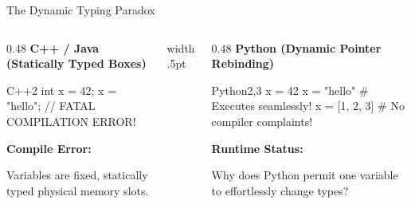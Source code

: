 \begin{frame}[fragile]{The Dynamic Typing Paradox}
  \begin{columns}[T,onlytextwidth]
    \begin{column}{0.48\textwidth}
      {\small\bfseries\color{UpGradRed}C++ / Java (Statically Typed Boxes)}\par\vspace{0.08cm}
      \begin{HighlightedCodeBlock}{C++}{2}
int x = 42;
x = "hello"; // FATAL COMPILATION ERROR!
      \end{HighlightedCodeBlock}
      \vspace{0.08cm}
      \begin{tcolorbox}[enhanced,arc=1mm,boxrule=.4pt,colback=UpGradRed!10,colframe=UpGradRed,left=2mm,right=2mm,top=1.5mm,bottom=1.5mm]
        {\scriptsize\bfseries\color{UpGradRedDark}Compile Error:}
      \end{tcolorbox}
      \vspace{0.04cm}
      {\scriptsize\color{UpGradSlate}Variables are fixed, statically typed physical memory slots.}
    \end{column}
    \hfill{\color{UpGradRule}\vrule width .5pt}\hfill
    \begin{column}{0.48\textwidth}
      {\small\bfseries\color{AWSBlue}Python (Dynamic Pointer Rebinding)}\par\vspace{0.08cm}
      \begin{HighlightedCodeBlock}{Python}{2,3}
x = 42
x = "hello"     # Executes seamlessly!
x = [1, 2, 3]   # No compiler complaints!
      \end{HighlightedCodeBlock}
      \vspace{0.08cm}
      \begin{tcolorbox}[enhanced,arc=1mm,boxrule=.4pt,colback=AWSEmerald!10,colframe=AWSEmerald,left=2mm,right=2mm,top=1.5mm,bottom=1.5mm]
        {\scriptsize\bfseries\color{AWSEmerald}Runtime Status:}
      \end{tcolorbox}
      \vspace{0.04cm}
      {\scriptsize\color{UpGradSlate}Why does Python permit one variable to effortlessly change types?}
    \end{column}
  \end{columns}
  \vspace{0.18cm}
\end{frame}

